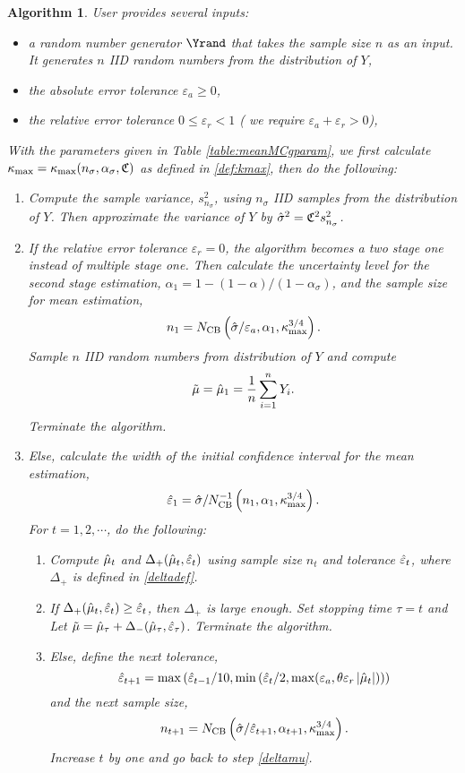 \documentclass{iitthesis}
\newtheorem{algorithm}[theorem]{Algorithm}
\theoremstyle{definition}
\begin{document}
\begin{algorithm}\label{alg:meanMCg} 
User provides several inputs:
\begin{itemize}
\item a random number generator $\Yrand$ that takes the sample size $n$ as an input. It generates $n$ IID random numbers from the distribution of $Y$,
\item the absolute error tolerance $\varepsilon_a \geq 0$,
\item the relative error tolerance $0 \leq \varepsilon_r <1$ ( we require $\varepsilon_a+\varepsilon_r >0$),
\end{itemize}
With the parameters given in Table \ref{table:meanMCgparam}, we first calculate $\kappa_{\max}=\kappa_{\max}(n_\sigma,\alpha_\sigma,\mathfrak{C})$ as defined in \eqref{def:kmax}, then do the following:
\begin{enumerate}
\item Compute the sample variance, $s^2_{n_{\sigma}}$, using $n_\sigma$ IID samples from the distribution of $Y$. Then approximate the variance of $Y$ by $\hat{\sigma}^2 = \mathfrak{C}^2 s^2_{n_\sigma}$. 
\item If the relative error tolerance $\varepsilon_r=0$, the algorithm becomes a two stage one instead of multiple stage one. Then calculate the uncertainty level for the second stage estimation, $\alpha_1 = 1-(1-\alpha)/(1-\alpha_\sigma)$, and the sample size for mean estimation,
$$n_1 = N_{\text{CB}}\left(\hat{\sigma}/\varepsilon_a,\alpha_1,\kappa_{\max}^{3/4}\right).$$ 
Sample $n$ IID random numbers from distribution of $Y$ and compute $$\tilde{\mu} =\hat{\mu}_1 = \frac1n\sum_{i=1}^nY_i.$$
Terminate the algorithm.
\item Else, calculate the width of the initial confidence interval for the mean estimation,
\begin{align}\label{eps1def}
\hat{\varepsilon}_1=\hat{\sigma} /N_{\text{CB}}^{-1}\left(n_1,\alpha_1,\kappa_{\max}^{3/4}\right).
\end{align}
For $t = 1,2,\cdots$, do the following:
\begin{enumerate}
\item \label{deltamu}Compute $\hat{\mu}_t$ and $\Delta_{+}(\hat{\mu}_t,\hat{\varepsilon}_t)$ using sample size $n_t$ and tolerance $\hat{\varepsilon}_t$, where $\Delta_{+}$ is defined in \eqref{deltadef}.
\item If $\Delta_{+}(\hat{\mu}_t,\hat{\varepsilon}_t) \geq  \hat{\varepsilon}_t$, then $\Delta_{+}$ is large enough. Set stopping time $\tau = t$ and Let $\tilde{\mu} = \hat{\mu}_{\tau}+\Delta_{-}(\hat{\mu}_\tau,\hat{\varepsilon}_\tau)$. Terminate the algorithm.
\item Else, define the next tolerance, $$\hat{\varepsilon}_{t+1} = \max \left ( \hat{\varepsilon}_{t-1}/10,\min\left(\hat{\varepsilon}_t/2, \max(\varepsilon_a,\theta\varepsilon_r\left \lvert \hat{\mu}_t \right \rvert)\right)\right)$$ and the next sample size, $$n_{t+1} = N_{\text{CB}}\left(\hat{\sigma}/\hat{\varepsilon}_{t+1},\alpha_{t+1},\kappa_{\max}^{3/4}\right).$$ Increase $t$ by one and go back to step \eqref{deltamu}. 
\end{enumerate}
\end{enumerate}
\end{algorithm}
\end{document}
